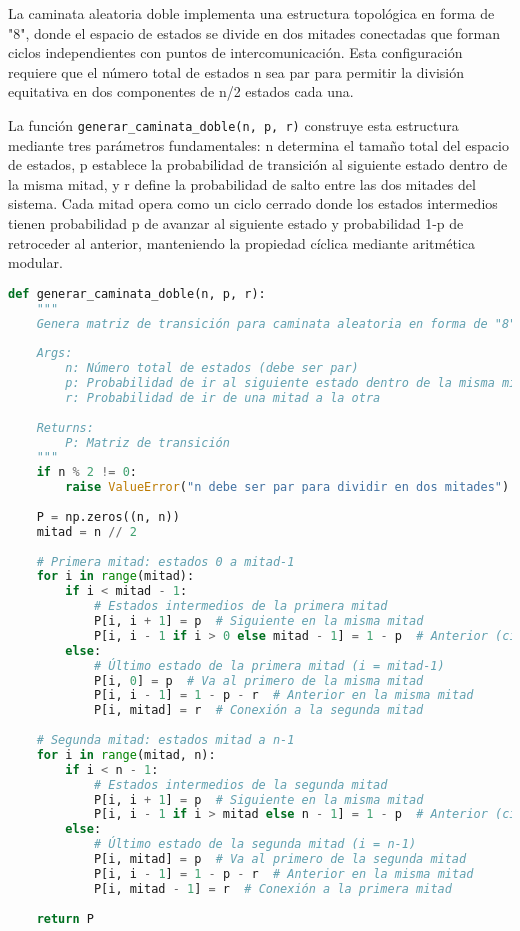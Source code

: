 La caminata aleatoria doble implementa una estructura topológica en forma de "8", donde el espacio de estados se divide en dos mitades conectadas que forman ciclos independientes con puntos de intercomunicación. Esta configuración requiere que el número total de estados n sea par para permitir la división equitativa en dos componentes de n/2 estados cada una.

La función \texttt{generar\_caminata\_doble(n, p, r)} construye esta estructura mediante tres parámetros fundamentales: n determina el tamaño total del espacio de estados, p establece la probabilidad de transición al siguiente estado dentro de la misma mitad, y r define la probabilidad de salto entre las dos mitades del sistema. Cada mitad opera como un ciclo cerrado donde los estados intermedios tienen probabilidad p de avanzar al siguiente estado y probabilidad 1-p de retroceder al anterior, manteniendo la propiedad cíclica mediante aritmética modular.

\begin{lstlisting}[language=Python]
def generar_caminata_doble(n, p, r):
    """
    Genera matriz de transición para caminata aleatoria en forma de "8".
    
    Args:
        n: Número total de estados (debe ser par)
        p: Probabilidad de ir al siguiente estado dentro de la misma mitad
        r: Probabilidad de ir de una mitad a la otra
    
    Returns:
        P: Matriz de transición
    """
    if n % 2 != 0:
        raise ValueError("n debe ser par para dividir en dos mitades")
    
    P = np.zeros((n, n))
    mitad = n // 2
    
    # Primera mitad: estados 0 a mitad-1
    for i in range(mitad):
        if i < mitad - 1:
            # Estados intermedios de la primera mitad
            P[i, i + 1] = p  # Siguiente en la misma mitad
            P[i, i - 1 if i > 0 else mitad - 1] = 1 - p  # Anterior (cíclico)
        else:
            # Último estado de la primera mitad (i = mitad-1)
            P[i, 0] = p  # Va al primero de la misma mitad
            P[i, i - 1] = 1 - p - r  # Anterior en la misma mitad
            P[i, mitad] = r  # Conexión a la segunda mitad
    
    # Segunda mitad: estados mitad a n-1
    for i in range(mitad, n):
        if i < n - 1:
            # Estados intermedios de la segunda mitad
            P[i, i + 1] = p  # Siguiente en la misma mitad
            P[i, i - 1 if i > mitad else n - 1] = 1 - p  # Anterior (cíclico)
        else:
            # Último estado de la segunda mitad (i = n-1)
            P[i, mitad] = p  # Va al primero de la segunda mitad
            P[i, i - 1] = 1 - p - r  # Anterior en la misma mitad
            P[i, mitad - 1] = r  # Conexión a la primera mitad
    
    return P
\end{lstlisting}

